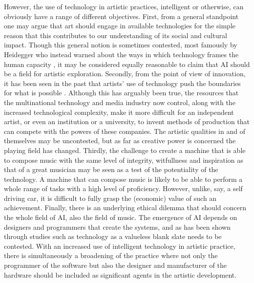 \documentclass[11pt]{article}
\begin{document}
However, the use of technology in artistic practices, intelligent or otherwise, can obviously have a range of different objectives. First, from a general standpoint one may argue that art should engage in available technologies for the simple reason that this contributes to our understanding of its social and cultural impact. Though this general notion is sometimes contested, most famously by Heidegger who instead warned about the ways in which technology frames the human capacity \citep{heidegger93}, it may be considered equally reasonable to claim that AI should be a field for artistic exploration. Secondly, from the point of view of innovation, it has been seen in the past that artists' use of technology push the boundaries for what is possible \citep{harris1999}. Although this has arguably been true, the resources that the multinational technology and media industry now control, along with the increased  technological complexity, make it more difficult for an independent artist, or even an institution or a university, to invent methods of production that can compete with the powers of these companies. The artistic qualities in and of themselves may be uncontested, but as far as creative power is concerned the playing field has changed. Thirdly, the challenge to create a machine that is able to compose music with the same level of integrity, witfullness and inspiration as that of a great musician may be seen as a test of the potentiality of the technology. A machine that can compose music is likely to be able to perform a whole range of tasks with a high level of proficiency. However, unlike, say, a self driving car, it is difficult to fully grasp the (economic) value of such an achievement. Finally, there is an underlying ethical dilemma that should concern the whole field of AI, also the field of music. The emergence of AI depends on designers and programmers that create the systems, and as has been shown through studies such as \citet{snow2018} technology as a valueless blank slate needs to be contested. With an increased use of intelligent technology in artistic practice, there is simultaneously a broadening of the practice where not only the programmer of the software but also the designer and manufacturer of the hardware should be included as significant agents in the artistic development.
\end{document}

